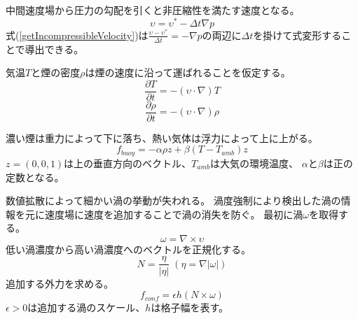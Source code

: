 \documentclass{ujarticle}
\begin{document}
中間速度場から圧力の勾配を引くと非圧縮性を満たす速度となる。
\begin{equation}
\label{getIncompressibleVelocity}
\upsilon = \upsilon^* - \Delta t \nabla p
\end{equation}
式(\ref{getIncompressibleVelocity})は$\frac{\upsilon - \upsilon^* }{\Delta t} = - \nabla p$の両辺に$\Delta t$を掛けて式変形することで導出できる。

気温$T$と煙の密度$\rho$は煙の速度に沿って運ばれることを仮定する。
\begin{equation}
\label{temperature}
\frac{\partial T}{\partial t} = - ( \upsilon \cdot \nabla)T
\end{equation}
\begin{equation}
\label{temperature}
\frac{\partial \rho}{\partial t} = - ( \upsilon \cdot \nabla)\rho
\end{equation}

濃い煙は重力によって下に落ち、熱い気体は浮力によって上に上がる。
\begin{equation}
\label{buoyancy}
f_{buoy}=-\alpha\rho z + \beta(T-T_{amb}) z
\end{equation} 
$z=(0,0,1)$は上の垂直方向のベクトル、$T_{amb}$は大気の環境温度、
$\alpha$と$\beta$は正の定数となる。

数値拡散によって細かい渦の挙動が失われる。
渦度強制により検出した渦の情報を元に速度場に速度を追加することで渦の消失を防ぐ。
最初に渦$\omega$を取得する。
\begin{equation}
\label{volticity}
\omega=\nabla \times \upsilon
\end{equation}
低い渦濃度から高い渦濃度へのベクトルを正規化する。
\begin{equation}
\label{normalizeVelocityLocation}
N=\frac{\eta}{|\eta|}\;(\eta=\nabla|\omega|)
\end{equation}
追加する外力を求める。
\begin{equation}
\label{confinementForce}
f_{conf}=\epsilon h (N \times \omega)
\end{equation}
$\epsilon > 0$は追加する渦のスケール、$h$は格子幅を表す。
\end{document}
